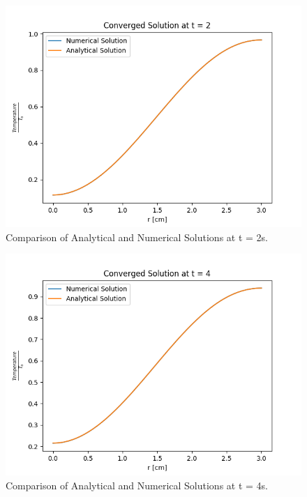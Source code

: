 \documentclass[12pt,letterpaper]{article}
\begin{document}
\begin{figure}[htbp!]
  \begin{center}
    \includegraphics[scale=0.7]{conv_2s.png}
  \end{center}
  \caption{Comparison of Analytical and Numerical Solutions at t = 2s.}
  \label{fig:conv_2}
\end{figure}


\begin{figure}[htbp!]
  \begin{center}
    \includegraphics[scale=0.7]{conv_4s.png}
  \end{center}
  \caption{Comparison of Analytical and Numerical Solutions at t = 4s.}
  \label{fig:conv_4}
\end{figure}
\end{document}
